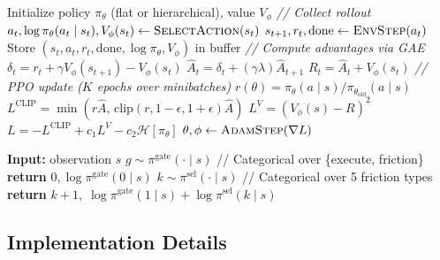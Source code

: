 \begin{algorithm}[t]
\caption{PPO training of the friction policy}
\label{alg:ppo}
\begin{algorithmic}[1]
\STATE Initialize policy $\pi_\theta$ (flat or hierarchical), value $V_\phi$
    \STATE \emph{// Collect rollout}
        \STATE $a_t,\log\pi_\theta(a_t\mid s_t),V_\phi(s_t) \leftarrow \textsc{SelectAction}(s_t)$
        \STATE $s_{t+1}, r_t, \text{done} \leftarrow \textsc{EnvStep}(a_t)$
        \STATE Store $(s_t, a_t, r_t, \text{done}, \log\pi_\theta, V_\phi)$ in buffer
    \ENDFOR
    \STATE \emph{// Compute advantages via GAE}
        \STATE $\delta_t = r_t + \gamma V_\phi(s_{t+1}) - V_\phi(s_t)$
        \STATE $\hat{A}_t = \delta_t + (\gamma\lambda)\hat{A}_{t+1}$
    \ENDFOR
    \STATE $R_t = \hat{A}_t + V_\phi(s_t)$
    \STATE \emph{// PPO update ($K$ epochs over minibatches)}
            \STATE $r(\theta) = \pi_\theta(a\mid s)/\pi_{\theta_{\text{old}}}(a \mid s)$
            \STATE $L^{\text{CLIP}} = \min(r\hat{A},\,\text{clip}(r,1{-}\epsilon,1{+}\epsilon)\hat{A})$
            \STATE $L^{V} = (V_\phi(s) - R)^2$
            \STATE $L = -L^{\text{CLIP}} + c_1 L^V - c_2 \mathcal{H}[\pi_\theta]$
            \STATE $\theta,\phi \leftarrow \textsc{AdamStep}(\nabla L)$
        \ENDFOR
    \ENDFOR
\ENDFOR
\end{algorithmic}
\end{algorithm}

\begin{algorithm}[t]
\caption{Hierarchical action selection}
\label{alg:hier}
\begin{algorithmic}[1]
\STATE \textbf{Input:} observation $s$
\STATE $g \sim \pi^{\text{gate}}(\cdot \mid s)$ \quad // Categorical over \{execute, friction\}
    \STATE \textbf{return} $0, \log\pi^{\text{gate}}(0 \mid s)$
\ELSE
    \STATE $k \sim \pi^{\text{sel}}(\cdot \mid s)$ \quad // Categorical over 5 friction types
    \STATE \textbf{return} $k+1,\; \log\pi^{\text{gate}}(1\mid s) + \log\pi^{\text{sel}}(k\mid s)$
\ENDIF
\end{algorithmic}
\end{algorithm}

\subsection{Implementation Details}

